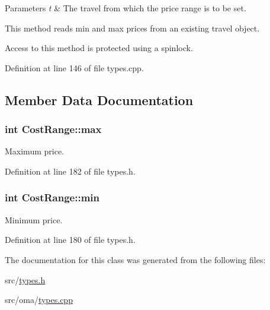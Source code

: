 \begin{DoxyParams}{Parameters}
{\em t} & The travel from which the price range is to be set.\\
\hline
\end{DoxyParams}
This method reads min and max prices from an existing travel object.

Access to this method is protected using a spinlock. 

Definition at line 146 of file types.\-cpp.



\subsection{Member Data Documentation}
\hypertarget{class_cost_range_a1f758d95074553812b9af90a57eee99d}{
\subsubsection[{max}]{\setlength{\rightskip}{0pt plus 5cm}int Cost\-Range\-::max}}\label{class_cost_range_a1f758d95074553812b9af90a57eee99d}


Maximum price. 



Definition at line 182 of file types.\-h.

\hypertarget{class_cost_range_ab9e6b517daae3ef23654e90f243b4f8d}{
\subsubsection[{min}]{\setlength{\rightskip}{0pt plus 5cm}int Cost\-Range\-::min}}\label{class_cost_range_ab9e6b517daae3ef23654e90f243b4f8d}


Minimum price. 



Definition at line 180 of file types.\-h.



The documentation for this class was generated from the following files\-:\begin{DoxyCompactItemize}
\item 
src/\hyperlink{types_8h}{types.\-h}\item 
src/oma/\hyperlink{types_8cpp}{types.\-cpp}\end{DoxyCompactItemize}
